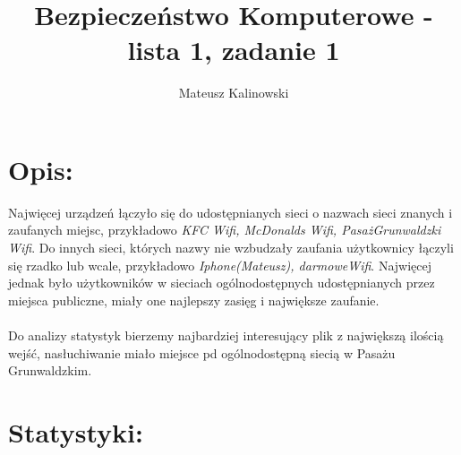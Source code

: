 \documentclass{article}
\title{Bezpieczeństwo Komputerowe - lista 1, zadanie 1}
\author{Mateusz Kalinowski}
\begin{document}
\maketitle
\newpage
\section{Opis:}
Najwięcej urządzeń łączyło się do udostępnianych sieci o nazwach sieci znanych i zaufanych miejsc, przykładowo \textit{KFC Wifi, McDonalds Wifi, PasażGrunwaldzki Wifi}. Do innych sieci, których nazwy nie wzbudzały zaufania użytkownicy łączyli się rzadko lub wcale, przykładowo \textit{Iphone(Mateusz), darmoweWifi}. Najwięcej jednak było użytkowników w sieciach ogólnodostępnych udostępnianych przez miejsca publiczne, miały one najlepszy zasięg i największe zaufanie. 
\\
\\
Do analizy statystyk bierzemy najbardziej interesujący plik z największą ilością wejść, nasłuchiwanie miało miejsce pd ogólnodostępną siecią w Pasażu Grunwaldzkim.
\section{Statystyki:}
\end{document}

